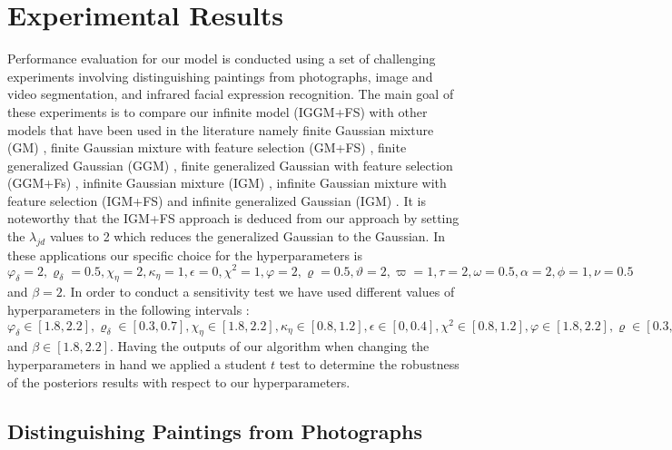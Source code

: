 \documentclass[journal,10pt]{elsart}
\begin{document}
\section{Experimental Results}
Performance evaluation for our model is conducted using a set of challenging experiments involving distinguishing paintings from photographs, image and video segmentation, and infrared facial expression recognition. The main goal of these experiments is to compare our infinite model (IGGM+FS) with other models that have been used in the literature namely finite Gaussian mixture (GM) \cite{JainFinite}, finite Gaussian mixture with feature selection (GM+FS) \cite{Law2004}, finite generalized Gaussian (GGM) \cite{Allili2008}, finite generalized Gaussian with feature selection (GGM+Fs) \cite{Allili2010}, infinite Gaussian mixture (IGM) \cite{Edward2000}, infinite Gaussian mixture with feature selection (IGM+FS) and infinite generalized Gaussian (IGM) \cite{DBLP:conf/iciar/ElguebalyB11}. It is noteworthy that the IGM+FS approach is deduced from our approach by setting the 
$\lambda_{jd}$ values to 2 which reduces the generalized Gaussian to the Gaussian. 
In these applications our specific choice for the hyperparameters 
is $\varphi_{\delta}=2,\varrho_{\delta}=0.5,\chi_{\eta}=2,\kappa_{\eta}=1,\epsilon=0,\chi^2=1,\varphi=2,\varrho=0.5,\vartheta=2,\varpi=1,\tau=2,\omega=0.5,\alpha=2,\phi=1,\nu=0.5$ and $\beta=2$.  In order to conduct a sensitivity test we have used different values of hyperparameters in the following intervals :$\varphi_{\delta} \in[1.8,2.2], \varrho_{\delta} \in [0.3,0.7], \chi_{\eta} \in [1.8,2.2], \kappa_{\eta} \in [0.8,1.2], \epsilon \in [0,0.4], \chi^2 \in [0.8,1.2], \varphi \in [1.8,2.2], \varrho \in [0.3,0.7], \vartheta \in [1.8,2.2], \varpi \in [0.8,1.2], \tau \in [1.8,2.2], \omega \in [0.3,0.7], \alpha \in [1.8,2.2], \phi \in [0.8,1.2], \nu \in [0.3,0.7]$ and $\beta \in [1.8,2.2]$. Having the outputs of our algorithm when changing the hyperparameters in hand we applied a student $t$ test to determine the robustness of the posteriors results with respect to our hyperparameters.
\subsection{Distinguishing Paintings from Photographs}
\end{document}
